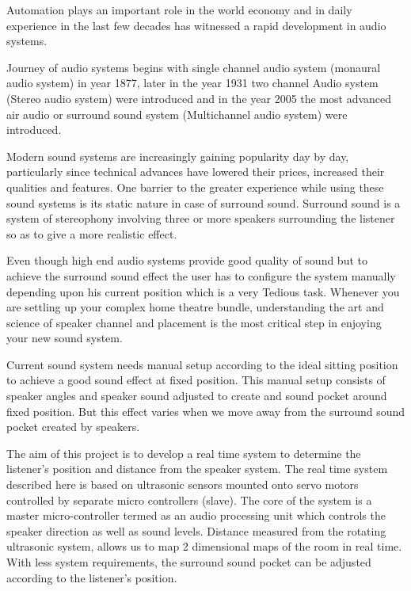 \documentclass[../../../patent_v1.tex]{subfiles}
\begin{document}
Automation plays an important role in the world 
economy and in daily experience in the last few 
decades has witnessed a rapid development in audio
systems.

Journey of audio systems begins with single channel 
audio system (monaural audio system) in year 1877, 
later in the year 1931 two channel Audio system 
(Stereo audio system) were introduced and in the year 
2005 the most advanced air audio or surround sound 
system (Multichannel audio system) were introduced.

Modern sound systems are increasingly gaining 
popularity day by day, particularly since technical 
advances have lowered their prices, increased their
qualities and features. One barrier to the greater 
experience while using these sound systems is its 
static nature in case of surround sound. Surround 
sound is a system of stereophony involving three or 
more speakers surrounding the listener so as to give a 
more realistic effect.

Even though high end audio systems provide good quality 
of sound but to achieve the surround sound effect the 
user has to configure the system manually depending 
upon his current position which is a very Tedious task.
Whenever you are settling up your complex home theatre 
bundle, understanding the art and science of speaker 
channel and placement is the most critical step in enjoying 
your new sound system.

Current sound system needs manual setup according to the 
ideal sitting position to achieve a good sound effect at 
fixed position. This manual setup consists of speaker angles 
and speaker sound adjusted to create and sound pocket around 
fixed position. But this effect varies when we move away
from the surround sound pocket created by speakers.

The aim of this project is to develop a real time system to 
determine the listener’s position and distance from the speaker 
system. The real time system described here is based on 
ultrasonic sensors mounted onto servo motors controlled by 
separate micro controllers (slave). The core of the system
is a master micro-controller termed as an audio processing 
unit which controls the speaker direction as well as sound levels. 
Distance measured from the rotating ultrasonic system, allows us 
to map 2 dimensional maps of the room in real time. With less 
system requirements, the surround sound pocket can be
adjusted according to the listener's position.
\end{document}
